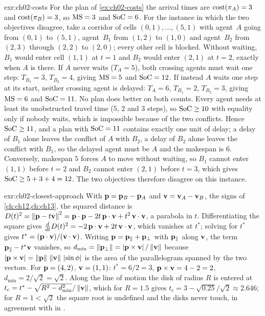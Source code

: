\begin{solution}{exr:ch02-costs}
For the plan of \cref{ex:ch02-costs} the arrival times are $\operatorname{cost}(\pi_A)=3$ and $\operatorname{cost}(\pi_B)=3$, so $\mathrm{MS}=3$ and $\mathrm{SoC}=6$. For the instance in which the two objectives disagree, take a corridor of cells $(0,1),\dots,(5,1)$ with agent~$A$ going from $(0,1)$ to $(5,1)$, agent~$B_1$ from $(1,2)$ to $(1,0)$ and agent~$B_2$ from $(2,3)$ through $(2,2)$ to $(2,0)$; every other cell is blocked. Without waiting, $B_1$ would enter cell $(1,1)$ at $t=1$ and $B_2$ would enter $(2,1)$ at $t=2$, exactly when $A$ is there. If $A$ never waits ($T_A=5$), both crossing agents must wait one step: $T_{B_1}=3$, $T_{B_2}=4$, giving $\mathrm{MS}=5$ and $\mathrm{SoC}=12$. If instead $A$ waits one step at its start, neither crossing agent is delayed: $T_A=6$, $T_{B_1}=2$, $T_{B_2}=3$, giving $\mathrm{MS}=6$ and $\mathrm{SoC}=11$. No plan does better on both counts. Every agent needs at least its unobstructed travel time ($5$, $2$ and $3$ steps), so $\mathrm{SoC}\ge10$ with equality only if nobody waits, which is impossible because of the two conflicts. Hence $\mathrm{SoC}\ge11$, and a plan with $\mathrm{SoC}=11$ contains exactly one unit of delay; a delay of $B_1$ alone leaves the conflict of $A$ with $B_2$, a delay of $B_2$ alone leaves the conflict with $B_1$, so the delayed agent must be $A$ and the makespan is $6$. Conversely, makespan $5$ forces $A$ to move without waiting, so $B_1$ cannot enter $(1,1)$ before $t=2$ and $B_2$ cannot enter $(2,1)$ before $t=3$, which gives $\mathrm{SoC}\ge5+3+4=12$. The two objectives therefore disagree on this instance.
\end{solution}

\begin{solution}{exr:ch02-closest-approach}
With $\mathbf{p}=\mathbf{p}_B-\mathbf{p}_A$ and $\mathbf{v}=\mathbf{v}_A-\mathbf{v}_B$, the signs of \cref{ch:ch12,ch:ch13}, the squared distance is $D(t)^2=\left\lVert \mathbf{p}-t\mathbf{v} \right\rVert^2=\mathbf{p}\cdot\mathbf{p}-2t\,\mathbf{p}\cdot\mathbf{v}+t^2\,\mathbf{v}\cdot\mathbf{v}$, a parabola in $t$. Differentiating the square gives $\tfrac{d}{dt}D(t)^2=-2\,\mathbf{p}\cdot\mathbf{v}+2t\,\mathbf{v}\cdot\mathbf{v}$, which vanishes at $t^{*}$; solving for $t^{*}$ gives $t^*=(\mathbf{p}\cdot\mathbf{v})/(\mathbf{v}\cdot\mathbf{v})$. Writing $\mathbf{p}=\mathbf{p}_\parallel+\mathbf{p}_\perp$ with $\mathbf{p}_\parallel$ along $\mathbf{v}$, the term $\mathbf{p}_\parallel-t^*\mathbf{v}$ vanishes, so $d_{\min}=\left\lVert \mathbf{p}_\perp \right\rVert=\left\lvert \mathbf{p}\times\mathbf{v} \right\rvert/\left\lVert \mathbf{v} \right\rVert$ because $\left\lvert \mathbf{p}\times\mathbf{v} \right\rvert=\left\lVert \mathbf{p} \right\rVert\,\left\lVert \mathbf{v} \right\rVert\,\left\lvert \sin\phi \right\rvert$ is the area of the parallelogram spanned by the two vectors. For $\mathbf{p}=(4,2)$, $\mathbf{v}=(1,1)$: $t^*=6/2=3$, $\mathbf{p}\times\mathbf{v}=4-2=2$, $d_{\min}=2/\sqrt{2}=\sqrt{2}$. Along the line of motion the disk of radius $R$ is entered at $t_c=t^*-\sqrt{R^2-d_{\min}^2}/\left\lVert \mathbf{v} \right\rVert$, which for $R=1.5$ gives $t_c=3-\sqrt{0.25}/\sqrt{2}\approx 2.646$; for $R=1<\sqrt{2}$ the square root is undefined and the disks never touch, in agreement with  in .
\end{solution}

